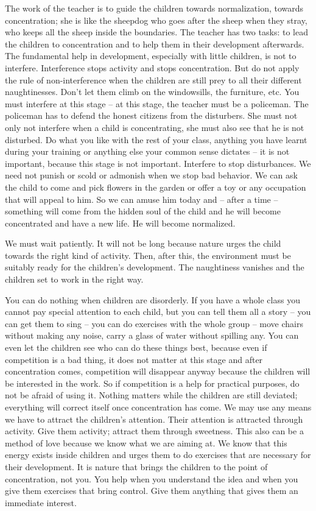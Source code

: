 \documentclass[lang=cn,10pt]{elegantbook}
\begin{document}
The work of the teacher is to guide the children towards
normalization, towards concentration; she is like the sheepdog who
goes after the sheep when they stray, who keeps all the sheep inside
the boundaries. The teacher has two tasks: to lead the children to
concentration and to help them in their development afterwards. The
fundamental help in development, especially with little children, is not
to interfere. Interference stops activity and stops concentration. But
do not apply the rule of non-interference when the children are still
prey to all their different naughtinesses. Don’t let them climb on the
windowsills, the furniture, etc. You must interfere at this stage – at
this stage, the teacher must be a policeman. The policeman has to
defend the honest citizens from the disturbers. She must not only not
interfere when a child is concentrating, she must also see that he is
not disturbed. Do what you like with the rest of your class, anything
you have learnt during your training or anything else your common
sense dictates – it is not important, because this stage is not
important. Interfere to stop disturbances. We need not punish or
scold or admonish when we stop bad behavior. We can ask the child
to come and pick flowers in the garden or offer a toy or any
occupation that will appeal to him. So we can amuse him today and
– after a time – something will come from the hidden soul of the child
and he will become concentrated and have a new life. He will
become normalized.

We must wait patiently. It will not be long because nature urges
the child towards the right kind of activity. Then, after this, the
environment must be suitably ready for the children’s development.
The naughtiness vanishes and the children set to work in the right
way.

You can do nothing when children are disorderly. If you have a
whole class you cannot pay special attention to each child, but you
can tell them all a story – you can get them to sing – you can do
exercises with the whole group – move chairs without making any
noise, carry a glass of water without spilling any. You can even let
the children see who can do these things best, because even if
competition is a bad thing, it does not matter at this stage and after
concentration comes, competition will disappear anyway because
the children will be interested in the work. So if competition is a help
for practical purposes, do not be afraid of using it. Nothing matters
while the children are still deviated; everything will correct itself once
concentration has come. We may use any means we have to attract
the children’s attention. Their attention is attracted through activity.
Give them activity; attract them through sweetness. This also can be
a method of love because we know what we are aiming at. We know
that this energy exists inside children and urges them to do
exercises that are necessary for their development. It is nature that
brings the children to the point of concentration, not you. You help
when you understand the idea and when you give them exercises
that bring control. Give them anything that gives them an immediate
interest.
\end{document}
